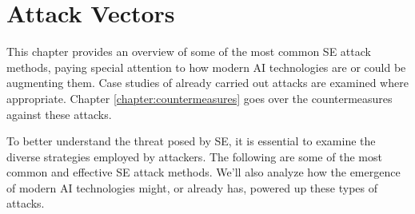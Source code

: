 


\chapter{Attack Vectors\label{chapter:attacks}}
\begin{comment}

Guides:
    - About 3-4 pages

TODO:
    [ ] 

What to cover:
    - Attacks
        - Deepfake generated synthetic media
            - Videos
            - Images
            - Audio
            - Real-time voice morphing
    
Literature:
    - 

\end{comment}


This chapter provides an overview of some of the most common SE attack methods, paying special attention to how modern AI technologies are or could be augmenting them. Case studies of already carried out attacks are examined where appropriate. Chapter \ref{chapter:countermeasures} goes over the countermeasures against these attacks.




To better understand the threat posed by SE, it is essential to examine the diverse strategies employed by attackers. The following are some of the most common and effective SE attack methods. We'll also analyze how the emergence of modern AI technologies might, or already has, powered up these types of attacks.

